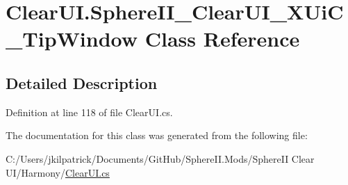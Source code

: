 \hypertarget{class_clear_u_i_1_1_sphere_i_i___clear_u_i___x_ui_c___tip_window}{}\section{Clear\+U\+I.\+Sphere\+I\+I\+\_\+\+Clear\+U\+I\+\_\+\+X\+Ui\+C\+\_\+\+Tip\+Window Class Reference}
\label{class_clear_u_i_1_1_sphere_i_i___clear_u_i___x_ui_c___tip_window}


\subsection{Detailed Description}


Definition at line 118 of file Clear\+U\+I.\+cs.



The documentation for this class was generated from the following file\+:\begin{DoxyCompactItemize}
\item 
C\+:/\+Users/jkilpatrick/\+Documents/\+Git\+Hub/\+Sphere\+I\+I.\+Mods/\+Sphere\+I\+I Clear U\+I/\+Harmony/\mbox{\hyperlink{_clear_u_i_8cs}{Clear\+U\+I.\+cs}}\end{DoxyCompactItemize}
